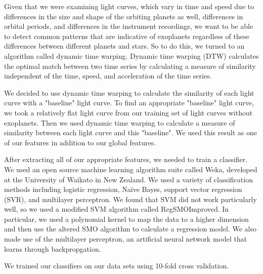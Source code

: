 \documentclass{amsart}
\begin{document}
Given that we were examining light curves, which vary in time and speed due to differences in the size and shape of the orbiting planets as well, differences in orbital periods, and differences in the instrument recordings, we want to be able to detect common patterns that are indicative of exoplanets regardless of these differences between different planets and stars. So to do this, we turned to an algorithm called dynamic time warping. Dynamic time warping (DTW) calculates the optimal match between two time series by calculating a measure of similarity independent of the time, speed, and acceleration of the time series. 

We decided to use dynamic time warping to calculate the similarity of each light curve with a "baseline" light curve. To find an appropriate "baseline" light curve, we took a relatively flat light curve from our training set of light curves without exoplanets. Then we used dynamic time warping to calculate a measure of similarity between each light curve and this "baseline". We used this result as one of our features in addition to our global features.

After extracting all of our appropriate features, we needed to train a classifier. We used an open source machine learning algorithm suite called Weka, developed at the University of Waikato in New Zealand. We used a variety of classification methods including logistic regression, Na\"ive Bayes, support vector regression (SVR), and multilayer perceptron. We found that SVM did not work particularly well, so we used a modified SVM algorithm called RegSMOImproved\cite{SMOreg}. In particular, we used a polynomial kernel to map the data to a higher dimension and then use the altered SMO algorithm to calculate a regression model. We also made use of the multilayer perceptron, an artificial neural network model that learns through backpropgation. 

We trained our classifiers on our data sets using 10-fold cross validation.

\end{document}
